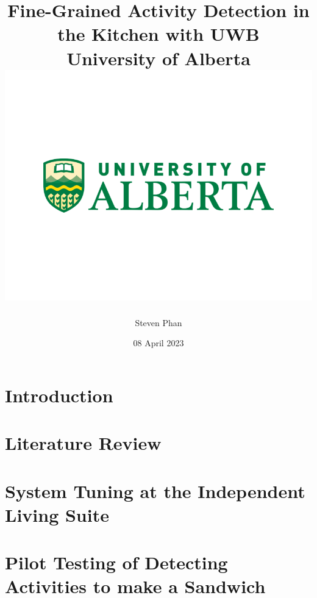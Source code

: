 \documentclass[12pt]{report}
\title{
    {Fine-Grained Activity Detection in the Kitchen with UWB}\\
    {\large University of Alberta}\\
    {\includegraphics[width=\textwidth]{university.png}}
}
\author{Steven Phan}
\date{08 April 2023}
\begin{document}
\maketitle


\tableofcontents

\chapter{Introduction}


\chapter{Literature Review}\label{chp2}


\chapter{System Tuning at the Independent Living Suite}\label{chp3}


\chapter{Pilot Testing of Detecting Activities to make a Sandwich}

% 



\end{document}
